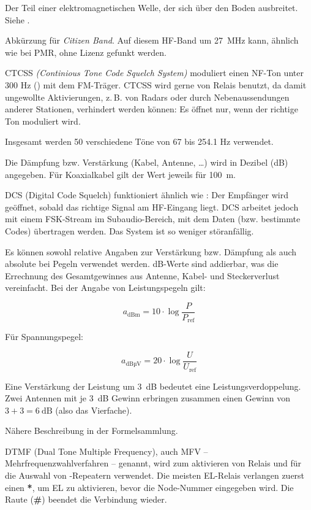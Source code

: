 {Der Teil einer elektromagnetischen Welle, der sich über den Boden ausbreitet. Siehe .}

{Abkürzung für \textit{Citizen Band}. Auf diesem HF-Band um 27 MHz kann, ähnlich wie bei PMR, ohne Lizenz gefunkt werden.}

{CTCSS \textit{(Continious Tone Code Squelch System)} moduliert einen NF-Ton unter 300 Hz () mit dem FM-Träger. CTCSS wird gerne von Relais benutzt, da damit ungewollte Aktivierungen, z. B. von Radars oder durch Nebenaussendungen anderer Stationen, verhindert werden können: Es öffnet nur, wenn der richtige Ton moduliert wird.

Insgesamt werden 50 verschiedene Töne von 67 bis 254.1 Hz verwendet.}

{Die Dämpfung bzw. Verstärkung (Kabel, Antenne, …) wird in Dezibel (dB) angegeben. Für Koaxialkabel gilt der Wert jeweils für 100 m.}

{DCS (Digital Code Squelch) funktioniert ähnlich wie : Der Empfänger wird geöffnet, sobald das richtige Signal am HF-Eingang liegt. DCS arbeitet jedoch mit einem FSK-Stream im Subaudio-Bereich, mit dem Daten (bzw. bestimmte Codes) übertragen werden. Das System ist so weniger störanfällig.}

{Es können sowohl relative Angaben zur Verstärkung bzw. Dämpfung als auch absolute bei Pegeln verwendet werden. dB-Werte sind addierbar, was die Errechnung des Gesamtgewinnes aus Antenne, Kabel- und Steckerverlust vereinfacht.
Bei der Angabe von Leistungspegeln gilt:

\[ a_\mathrm{dBm} = 10 \cdot \log \frac{P}{P_\mathrm{ref}} \]

Für Spannungspegel:

\[ a_\mathrm{dBµV} = 20 \cdot \log \frac{U}{U_\mathrm{ref}} \]

Eine Verstärkung der Leistung um 3 dB bedeutet eine Leistungsverdoppelung. Zwei Antennen mit je 3 dB Gewinn erbringen zusammen einen Gewinn von $3 + 3 = 6~\mathrm{dB}$ (also das Vierfache).

Nähere Beschreibung in der Formelsammlung.}

{DTMF (Dual Tone Multiple Frequency), auch MFV – Mehrfrequenzwahlverfahren – genannt, wird zum aktivieren von Relais und für die Auswahl von -Repeatern verwendet. Die meisten EL-Relais verlangen zuerst einen \textbf{*}, um EL zu aktivieren, bevor die Node-Nummer eingegeben wird. Die Raute (\textbf{\#}) beendet die Verbindung wieder.}

